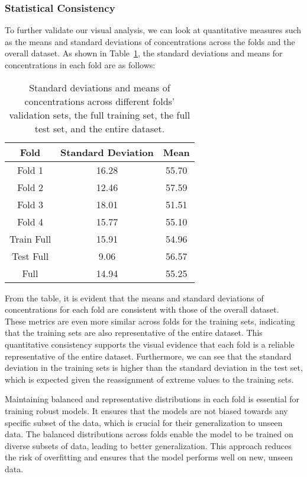 \subsubsection{Statistical Consistency}
To further validate our visual analysis, we can look at quantitative measures such as the means and standard deviations of  concentrations across the folds and the overall dataset.
As shown in Table~\ref{tab:siO2_std_means}, the standard deviations and means for  concentrations in each fold are as follows:

\begin{table}[h!]
    \centering
    \begin{tabular}{|c|c|c|}
        \hline
        \textbf{Fold} & \textbf{Standard Deviation} & \textbf{Mean} \\
        \hline
        Fold 1 & 16.28 & 55.70 \\
        \hline
        Fold 2 & 12.46 & 57.59 \\
        \hline
        Fold 3 & 18.01 & 51.51 \\
        \hline
        Fold 4 & 15.77 & 55.10 \\
        \hline
        Train Full & 15.91 & 54.96 \\
        \hline
        Test Full & 9.06 & 56.57 \\
        \hline
        Full & 14.94 & 55.25 \\
        \hline
    \end{tabular}
    \caption{Standard deviations and means of  concentrations across different folds' validation sets, the full training set, the full test set, and the entire dataset.}
    \label{tab:siO2_std_means}
\end{table}

From the table, it is evident that the means and standard deviations of  concentrations for each fold are consistent with those of the overall dataset.
These metrics are even more similar across folds for the training sets, indicating that the training sets are also representative of the entire dataset.
This quantitative consistency supports the visual evidence that each fold is a reliable representative of the entire dataset.
Furthermore, we can see that the standard deviation in the training sets is higher than the standard deviation in the test set, which is expected given the reassignment of extreme values to the training sets.

Maintaining balanced and representative distributions in each fold is essential for training robust models.
It ensures that the models are not biased towards any specific subset of the data, which is crucial for their generalization to unseen data.
The balanced distributions across folds enable the model to be trained on diverse subsets of data, leading to better generalization.
This approach reduces the risk of overfitting and ensures that the model performs well on new, unseen data.


